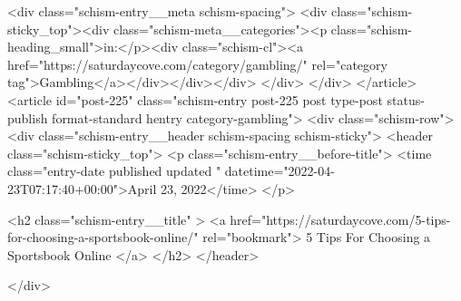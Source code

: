 {		<div class="schism-entry__meta schism-spacing">			<div class="schism-sticky_top"><div class="schism-meta__categories"><p class="schism-heading_small">in:</p><div class="schism-cl"><a href="https://saturdaycove.com/category/gambling/" rel="category tag">Gambling</a></div></div></div>		</div>
	</div>
</article>
<article id="post-225" class="schism-entry post-225 post type-post status-publish format-standard hentry category-gambling">
	<div class="schism-row">		<div class="schism-entry__header schism-spacing schism-sticky">			<header class="schism-sticky_top">				<p class="schism-entry__before-title">
					<time class="entry-date published updated " datetime="2022-04-23T07:17:40+00:00">April 23, 2022</time>				</p>

				<h2 class="schism-entry__title" >
					<a href="https://saturdaycove.com/5-tips-for-choosing-a-sportsbook-online/" rel="bookmark">
						5 Tips For Choosing a Sportsbook Online					</a>
				</h2>
			</header>

					</div>

}
